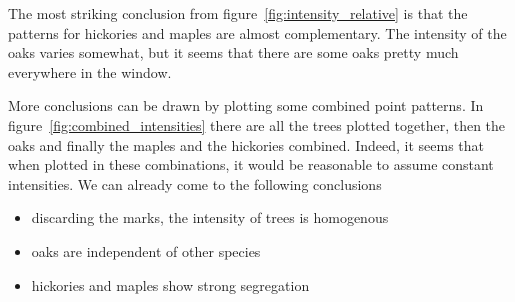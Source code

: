 \documentclass[12pt,a4paper,oneside,article]{memoir}
\begin{document}
The most striking conclusion from figure~\ref{fig:intensity_relative} is that
the patterns for hickories and maples are almost complementary. The intensity
of the oaks varies somewhat, but it seems that there are some oaks pretty
much everywhere in the window.

More conclusions can be drawn by plotting some combined point patterns. In 
figure~\ref{fig:combined_intensities} there are all the trees plotted together, then
the oaks and finally the maples and the hickories combined. Indeed, it seems
that when plotted in these combinations, it would be reasonable to assume
constant intensities. We can already come to the following
conclusions
\begin{itemize}
  \item discarding the marks, the intensity of trees is homogenous
  \item oaks are independent of other species
  \item hickories and maples show strong segregation
\end{itemize}
\end{document}
